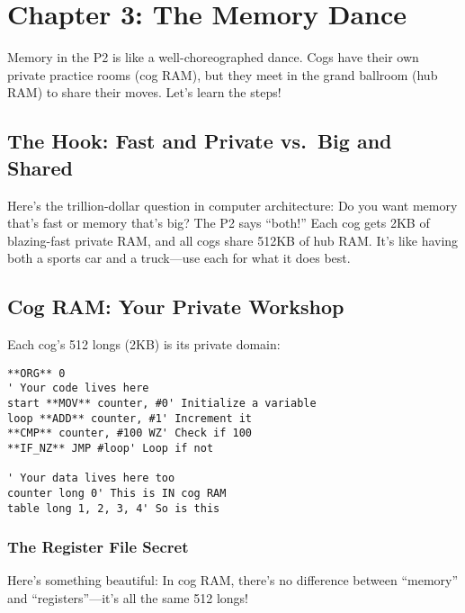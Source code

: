\documentclass[11pt]{book}
\begin{document}
\hypertarget{chapter-3-the-memory-dance}{%
\section{Chapter 3: The Memory Dance}\label{chapter-3-the-memory-dance}}

Memory in the P2 is like a well-choreographed dance. Cogs have their own
private practice rooms (cog RAM), but they meet in the grand ballroom
(hub RAM) to share their moves. Let's learn the steps!

\hypertarget{the-hook-fast-and-private-vs.-big-and-shared}{%
\subsection{The Hook: Fast and Private vs.~Big and
Shared}\label{the-hook-fast-and-private-vs.-big-and-shared}}

Here's the trillion-dollar question in computer architecture: Do you
want memory that's fast or memory that's big? The P2 says ``both!'' Each
cog gets 2KB of blazing-fast private RAM, and all cogs share 512KB of
hub RAM. It's like having both a sports car and a truck---use each for
what it does best.

\hypertarget{cog-ram-your-private-workshop}{%
\subsection{Cog RAM: Your Private
Workshop}\label{cog-ram-your-private-workshop}}

Each cog's 512 longs (2KB) is its private domain:

\begin{lstlisting}
**ORG** 0        
' Your code lives here
start **MOV** counter, #0' Initialize a variable
loop **ADD** counter, #1' Increment it
**CMP** counter, #100 WZ' Check if 100
**IF_NZ** JMP #loop' Loop if not
        
' Your data lives here too
counter long 0' This is IN cog RAM
table long 1, 2, 3, 4' So is this
\end{lstlisting}

\hypertarget{the-register-file-secret}{%
\subsubsection{The Register File
Secret}\label{the-register-file-secret}}

Here's something beautiful: In cog RAM, there's no difference between
``memory'' and ``registers''---it's all the same 512 longs!
\end{document}
